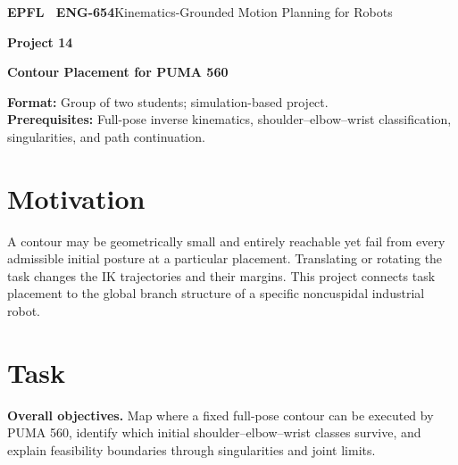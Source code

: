 \documentclass[11pt,a4paper]{article}
\begin{document}
{\small\textbf{EPFL \textbar\ ENG-654}\hfill Kinematics-Grounded Motion Planning for Robots}
\vspace{5mm}

{\color{epflred}\Large\bfseries Project 14}

{\LARGE\bfseries Contour Placement for PUMA 560\par}

\textbf{Format:} Group of two students; simulation-based project.\\
\textbf{Prerequisites:} Full-pose inverse kinematics, shoulder--elbow--wrist classification, singularities, and path continuation.

\section*{Motivation}
A contour may be geometrically small and entirely reachable yet fail
from every admissible initial posture at a particular placement. Translating
or rotating the task changes the IK trajectories and their margins. This
project connects task placement to the global branch structure of a specific
noncuspidal industrial robot.

\section*{Task}
\textbf{Overall objectives.} Map where a fixed full-pose contour can be executed by PUMA 560, identify
which initial shoulder--elbow--wrist classes survive, and explain feasibility
boundaries through singularities and joint limits.
\end{document}
